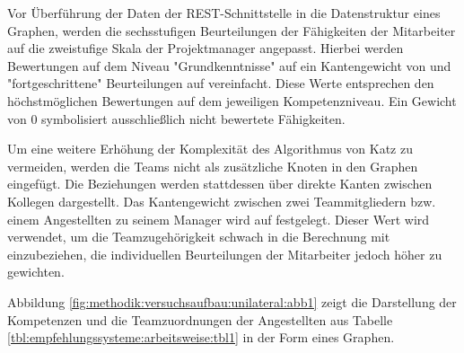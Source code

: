 Vor Überführung der Daten der REST-Schnittstelle in die Datenstruktur eines Graphen, werden die sechsstufigen Beurteilungen der Fähigkeiten der Mitarbeiter auf die zweistufige Skala der Projektmanager angepasst. Hierbei werden Bewertungen auf dem Niveau "Grundkenntnisse" auf ein Kantengewicht von \kantengewichtString und "fortgeschrittene" Beurteilungen auf \kantengewichtHochString vereinfacht. Diese Werte entsprechen den höchstmöglichen Bewertungen auf dem jeweiligen Kompetenzniveau. Ein Gewicht von 0 symbolisiert ausschließlich nicht bewertete Fähigkeiten.

Um eine weitere Erhöhung der Komplexität des Algorithmus von Katz zu vermeiden, werden die Teams nicht als zusätzliche Knoten in den Graphen eingefügt. Die Beziehungen werden stattdessen über direkte Kanten zwischen Kollegen dargestellt. Das Kantengewicht zwischen zwei Teammitgliedern bzw. einem Angestellten zu seinem Manager wird auf \teamgewichtString festgelegt. Dieser Wert wird verwendet, um die Teamzugehörigkeit schwach in die Berechnung mit einzubeziehen, die individuellen Beurteilungen der Mitarbeiter jedoch höher zu gewichten.%

Abbildung \ref{fig:methodik:versuchsaufbau:unilateral:abb1} zeigt die Darstellung der Kompetenzen und die Teamzuordnungen der Angestellten aus Tabelle \ref{tbl:empfehlungssysteme:arbeitsweise:tbl1} in der Form eines Graphen.%

